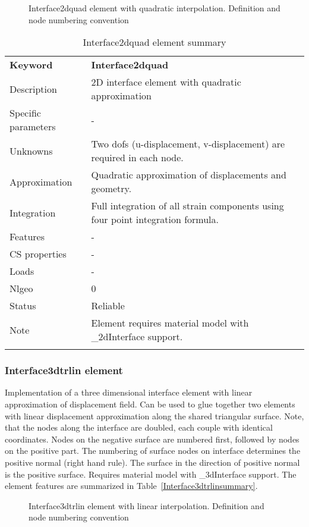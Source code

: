 \documentclass[a4paper]{article}
\newcommand{\param}[1]{\texttt{#1}} %
\newcommand{\templabel}{}%
\newcommand{\tempcaption}{}%
\newcounter{nelpar}
\newenvironment{elementsummary}[5]{%
  \gdef\tempcaption{#4}%
  \gdef\templabel{#5}%
  \setcounter{nelpar}{0}%
  \begin{center} %
    \begin{table}[!htb] %
      \begin{tabular}{|l|p{9cm}|}\hline %
        {\bf Keyword} & \bf{#1}\\ %
        {Description} & {#2}\\ %
        {Specific parameters} & {#3}\\ \hline %
}{
  \\ \hline %
      \end{tabular}%
      \caption{\tempcaption}%
      \label{\templabel}%
    \end{table}%
  \end{center}%
}
\newcommand{\elementParam}[1]{%
  \ifthenelse{\value{nelpar}>0} %
             {&{#1}}%
             {\setcounter{nelpar}{1}Parameters&{#1}}%
             \\%
}
\newcommand{\elementDescription}[2]{{#1} & {#2}\\ }
\begin{document}
\begin{figure}[htb]
 \centering
 \begin{makeimage}
 
 \end{makeimage}
 \caption{Interface2dquad element with quadratic interpolation. Definition and node numbering convention}
 \label{interf2d_quad_fig}
\end{figure}

\begin{elementsummary}{Interface2dquad}{2D  interface element with quadratic approximation}{-}{Interface2dquad element summary}{Interface2dquadsummary}
\elementDescription{Unknowns}{Two dofs (u-displacement, v-displacement) are required in each node.}
\elementDescription{Approximation}{Quadratic approximation of displacements and geometry.}
\elementDescription{Integration}{Full integration of all strain components using four point integration formula.}
\elementDescription{Features}{-}
\elementDescription{CS properties}{-}
\elementDescription{Loads}{-}
\elementDescription{Nlgeo}{0}
\elementDescription{Status}{Reliable}
\elementDescription{Note}{Element requires material model with \_2dInterface support.}
\end{elementsummary}

\subsubsection{Interface3dtrlin element}
Implementation of a three dimensional interface element with linear
approximation of displacement field. Can be used to glue together two elements with linear displacement approximation along the shared triangular surface. Note, that the nodes along the interface are doubled, each couple with identical coordinates. Nodes on the negative surface are numbered first, followed by nodes on the positive part. The numbering of surface nodes on interface determines the positive normal (right hand rule). The surface in the direction of positive normal is the positive surface. Requires material model with \_3dInterface support. The element features are summarized in Table~\ref{Interface3dtrlinsummary}.

\begin{figure}[htb]
 \centering
 \begin{makeimage}
  
 \end{makeimage}
 \caption{Interface3dtrlin element with linear interpolation. Definition and node numbering convention}
 \label{interf3d_lin_fig}
\end{figure}
\end{document}
